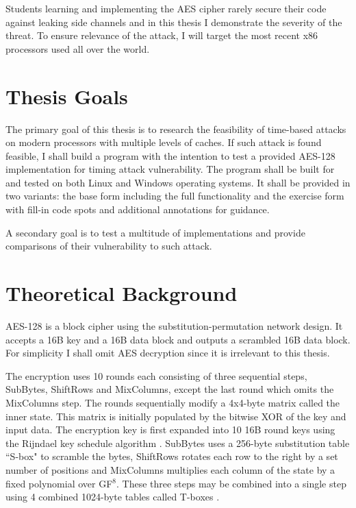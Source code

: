 \documentclass{article}
\begin{document}
Students learning and implementing the AES cipher rarely secure their code against leaking side channels and in this thesis I demonstrate the severity of the threat.
To ensure relevance of the attack, I will target the most recent x86 processors used all over the world.

\section{Thesis Goals}

The primary goal of this thesis is to research the feasibility of time-based attacks on modern processors with multiple levels of caches.
If such attack is found feasible, I shall build a program with the intention to test a provided AES-128 implementation for timing attack vulnerability.
The program shall be built for and tested on both Linux and Windows operating systems.
It shall be provided in two variants: the base form including the full functionality and the exercise form with fill-in code spots and additional annotations for guidance.

A secondary goal is to test a multitude of implementations and provide comparisons of their vulnerability to such attack.


\section{Theoretical Background}

AES-128 is a block cipher using the substitution-permutation network design. It accepts a 16B key and a 16B data block and outputs a scrambled 16B data block.
For simplicity I shall omit AES decryption since it is irrelevant to this thesis. 

The encryption uses 10 rounds each consisting of three sequential steps, SubBytes, ShiftRows and MixColumns, except the last round which omits the MixColumns step.
The rounds sequentially modify a 4x4-byte matrix called the inner state. This matrix is initially populated by the bitwise XOR of the key and input data.
The encryption key is first expanded into 10 16B round keys using the Rijndael key schedule algorithm \cite{FIPS}.
SubBytes uses a 256-byte substitution table ``S-box" to scramble the bytes, ShiftRows rotates each row to the right by a set number of positions and MixColumns multiplies each column of the state by a fixed polynomial over GF$^8$.
These three steps may be combined into a single step using 4 combined 1024-byte tables called T-boxes \cite{TBOX}.
\end{document}
